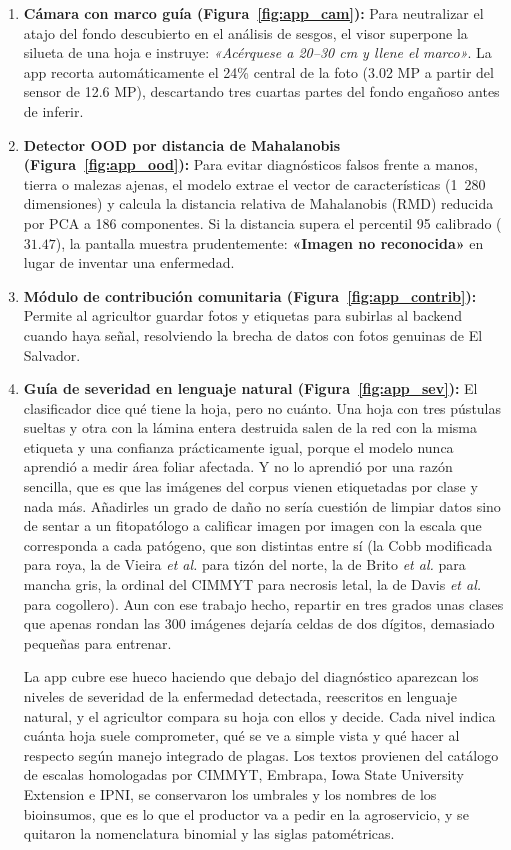 \documentclass[12pt,letterpaper]{article}
\begin{document}
\begin{enumerate}
\item \textbf{C\'amara con marco gu\'ia (Figura~\ref{fig:app_cam}):} Para neutralizar el atajo del fondo descubierto en el an\'alisis de sesgos, el visor superpone la silueta de una hoja e instruye: \textit{«Ac\'erquese a 20--30 cm y llene el marco»}. La app recorta autom\'aticamente el 24\% central de la foto (3.02 MP a partir del sensor de 12.6 MP), descartando tres cuartas partes del fondo enga\~noso antes de inferir.
\item \textbf{Detector OOD por distancia de Mahalanobis (Figura~\ref{fig:app_ood}):} Para evitar diagn\'osticos falsos frente a manos, tierra o malezas ajenas, el modelo extrae el vector de caracter\'isticas (1~280 dimensiones) y calcula la distancia relativa de Mahalanobis (RMD) reducida por PCA a 186 componentes. Si la distancia supera el percentil 95 calibrado ($31.47$), la pantalla muestra prudentemente: \textbf{«Imagen no reconocida»} en lugar de inventar una enfermedad.
\item \textbf{M\'odulo de contribuci\'on comunitaria (Figura~\ref{fig:app_contrib}):} Permite al agricultor guardar fotos y etiquetas para subirlas al backend cuando haya se\~nal, resolviendo la brecha de datos con fotos genuinas de El Salvador.
\item \textbf{Gu\'ia de severidad en lenguaje natural (Figura~\ref{fig:app_sev}):} El clasificador dice qu\'e tiene la hoja, pero no cu\'anto. Una hoja con tres p\'ustulas sueltas y otra con la l\'amina entera destruida salen de la red con la misma etiqueta y una confianza pr\'acticamente igual, porque el modelo nunca aprendi\'o a medir \'area foliar afectada. Y no lo aprendi\'o por una raz\'on sencilla, que es que las im\'agenes del corpus vienen etiquetadas por clase y nada m\'as. A\~nadirles un grado de da\~no no ser\'ia cuesti\'on de limpiar datos sino de sentar a un fitopat\'ologo a calificar imagen por imagen con la escala que corresponda a cada pat\'ogeno, que son distintas entre s\'i (la Cobb modificada para roya, la de Vieira \textit{et al.} para tiz\'on del norte, la de Brito \textit{et al.} para mancha gris, la ordinal del CIMMYT para necrosis letal, la de Davis \textit{et al.} para cogollero). Aun con ese trabajo hecho, repartir en tres grados unas clases que apenas rondan las 300 im\'agenes dejar\'ia celdas de dos d\'igitos, demasiado peque\~nas para entrenar.

La app cubre ese hueco haciendo que debajo del diagn\'ostico aparezcan los niveles de severidad de la enfermedad detectada, reescritos en lenguaje natural, y el agricultor compara su hoja con ellos y decide. Cada nivel indica cu\'anta hoja suele comprometer, qu\'e se ve a simple vista y qu\'e hacer al respecto seg\'un manejo integrado de plagas. Los textos provienen del cat\'alogo de escalas homologadas por CIMMYT, Embrapa, Iowa State University Extension e IPNI, se conservaron los umbrales y los nombres de los bioinsumos, que es lo que el productor va a pedir en la agroservicio, y se quitaron la nomenclatura binomial y las siglas patom\'etricas.
\end{enumerate}
\end{document}
